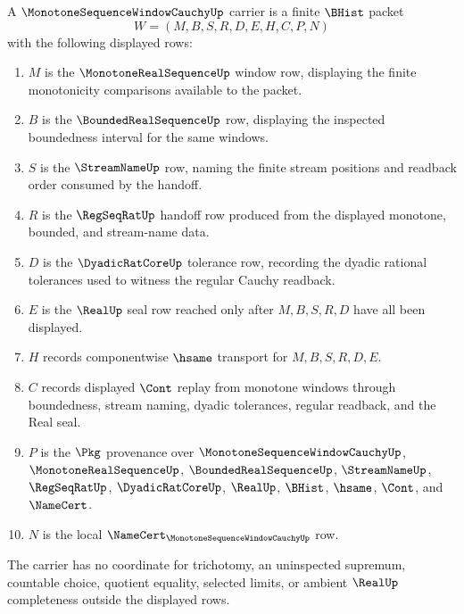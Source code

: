 \begin{definition}
\label{def:monotone-sequence-window-cauchy-carrier}
A $\MonotoneSequenceWindowCauchyUp$ carrier is a finite $\BHist$ packet
$$
W=(M,B,S,R,D,E,H,C,P,N)
$$
with the following displayed rows:
\begin{enumerate}
\item $M$ is the $\MonotoneRealSequenceUp$ window row, displaying the finite monotonicity comparisons available to the packet.
\item $B$ is the $\BoundedRealSequenceUp$ row, displaying the inspected boundedness interval for the same windows.
\item $S$ is the $\StreamNameUp$ row, naming the finite stream positions and readback order consumed by the handoff.
\item $R$ is the $\RegSeqRatUp$ handoff row produced from the displayed monotone, bounded, and stream-name data.
\item $D$ is the $\DyadicRatCoreUp$ tolerance row, recording the dyadic rational tolerances used to witness the regular Cauchy readback.
\item $E$ is the $\RealUp$ seal row reached only after $M,B,S,R,D$ have all been displayed.
\item $H$ records componentwise $\hsame$ transport for $M,B,S,R,D,E$.
\item $C$ records displayed $\Cont$ replay from monotone windows through boundedness, stream naming, dyadic tolerances, regular readback, and the Real seal.
\item $P$ is the $\Pkg$ provenance over $\MonotoneSequenceWindowCauchyUp$, $\MonotoneRealSequenceUp$, $\BoundedRealSequenceUp$, $\StreamNameUp$, $\RegSeqRatUp$, $\DyadicRatCoreUp$, $\RealUp$, $\BHist$, $\hsame$, $\Cont$, and $\NameCert$.
\item $N$ is the local $\NameCert_{\MonotoneSequenceWindowCauchyUp}$ row.
\end{enumerate}
The carrier has no coordinate for trichotomy, an uninspected supremum, countable choice, quotient equality, selected limits, or ambient $\RealUp$ completeness outside the displayed rows.
\end{definition}

